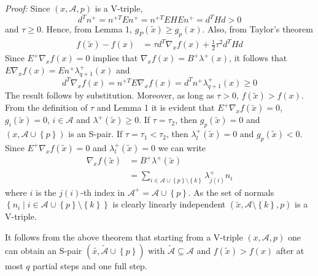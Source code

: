 \documentclass[a4paper,twoside,10pt,english]{report}
\begin{document}
\begin{framed}
\emph{Proof: }Since $\left(x,\mathcal{A},p\right)$ is a V-triple,
\[
d^{T}n^{+}=n^{+T}En^{+}=n^{+T}EHEn^{+}=d^{T}Hd>0
\]
and $\tau\ge0$. Hence, from Lemma 1, $g_{P}\left(\tilde{x}\right)\ge g_{p}\left(x\right)$.
Also, from Taylor's theorem 
\begin{align*}
f\left(\tilde{x}\right)-f\left(x\right) &= \tau d^{T}\nabla_{x}f\left(x\right)+\frac{1}{2}\tau^{2}d^{T}Hd
\end{align*}
Since $E^{+}\nabla_{x}f\left(x\right)=0$ implies that $\nabla_{x}f\left(x\right)=B^{+}\lambda^{+}\left(x\right)$,
it follows that $E\nabla_{x}f\left(x\right)=En^{+}\lambda_{q+1}^{+}\left(x\right)$
and
\[
d^{T}\nabla_{x}f\left(x\right)=n^{+T}E\nabla_{x}f\left(x\right)=d^{T}n^{+}\lambda_{q+1}^{+}\left(x\right)\ge0
\]
The result follows by substitution. Moreover, as long as $\tau>0$,
$f\left(\tilde{x}\right)>f\left(x\right)$. From the definition of
$\tau$ and Lemma 1 it is evident that $E^{+}\nabla_{x}f\left(\tilde{x}\right)=0$,
$g_{i}\left(\tilde{x}\right)=0$, $i\in\mathcal{A}$ and $\lambda^{+}\left(\tilde{x}\right)\ge0$.
If $\tau=\tau_{2}$, then $g_{p}\left(\tilde{x}\right)=0$ and $\left(x,\mathcal{A}\cup\left\{ p\right\} \right)$
is an S-pair. If $\tau=\tau_{1}<\tau_{2}$, then $\lambda_{l}^{+}\left(\tilde{x}\right)=0$
and $g_{p}\left(\tilde{x}\right)<0$. Since $E^{+}\nabla_{x}f\left(\tilde{x}\right)=0$
and $\lambda_{l}^{+}\left(\tilde{x}\right)=0$ we can write 
\begin{align*}
\nabla_{x}f\left(\tilde{x}\right) &= B^{+}\lambda^{+}\left(\tilde{x}\right)\\
 &= \sum_{i\in\mathcal{A}\cup\left\{ p\right\} \setminus\left\{ k\right\} }\lambda_{j\left(i\right)}^{+}n_{i}
\end{align*}
where $i$ is the $j\left(i\right)$-th index in $\mathcal{A}^{+}=\mathcal{A}\cup\left\{ p\right\} $.
As the set of normals $\left\{ n_{i}\mid i\in\mathcal{A}\cup\left\{ p\right\} \setminus\left\{ k\right\} \right\} $
is clearly linearly independent $\left(\tilde{x},\mathcal{A}\setminus\left\{ k\right\} ,p\right)$
is a V-triple. \end{framed}

It follows from the above theorem that starting from a V-triple $\left(x,\mathcal{A},p\right)$
one can obtain an S-pair $\left(\tilde{x,}\mathcal{\tilde{A}}\cup\left\{ p\right\} \right)$
with $\tilde{\mathcal{A}}\subseteq\mathcal{A}$ and $f\left(\tilde{x}\right)>f\left(x\right)$
after at most $q$ partial steps and one full step.
\end{document}
